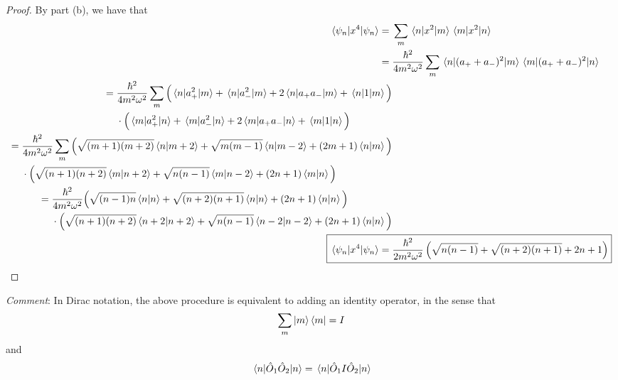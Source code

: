 \documentclass[../psets.tex]{subfiles}
\begin{document}
\begin{enumerate}
\begin{enumerate}
        \begin{proof}
            By part (b), we have that
            \begin{align*}
                \ev{x^4}{\psi_n} ={}& \sum_m\mel{n}{x^2}{m}\mel{m}{x^2}{n}\\
                ={}& \frac{\hbar^2}{4m^2\omega^2}\sum_m\mel{n}{(a_++a_-)^2}{m}\mel{m}{(a_++a_-)^2}{n}\\
                \begin{split}
                    ={}& \frac{\hbar^2}{4m^2\omega^2}\sum_m\Big( \mel{n}{a_+^2}{m}+\mel{n}{a_-^2}{m}+2\mel{n}{a_+a_-}{m}+\mel{n}{1}{m} \Big)\\
                    & \cdot\Big( \mel{m}{a_+^2}{n}+\mel{m}{a_-^2}{n}+2\mel{m}{a_+a_-}{n}+\mel{m}{1}{n} \Big)
                \end{split}\\
                \begin{split}
                    ={}& \frac{\hbar^2}{4m^2\omega^2}\sum_m\Big( \sqrt{(m+1)(m+2)}\braket{n}{m+2}+\sqrt{m(m-1)}\braket{n}{m-2}+(2m+1)\braket{n}{m} \Big)\\
                    & \cdot\Big( \sqrt{(n+1)(n+2)}\braket{m}{n+2}+\sqrt{n(n-1)}\braket{m}{n-2}+(2n+1)\braket{m}{n} \Big)
                \end{split}\\
                \begin{split}
                    ={}& \frac{\hbar^2}{4m^2\omega^2}\Big( \sqrt{(n-1)n}\braket{n}{n}+\sqrt{(n+2)(n+1)}\braket{n}{n}+(2n+1)\braket{n}{n} \Big)\\
                    & \cdot\Big( \sqrt{(n+1)(n+2)}\braket{n+2}{n+2}+\sqrt{n(n-1)}\braket{n-2}{n-2}+(2n+1)\braket{n}{n} \Big)
                \end{split}\\
                \Aboxed{\ev{x^4}{\psi_n} ={}& \frac{\hbar^2}{2m^2\omega^2}\left( \sqrt{n(n-1)}+\sqrt{(n+2)(n+1)}+2n+1 \right)}
            \end{align*}
        \end{proof}
    \end{enumerate}
    \emph{Comment}: In Dirac notation, the above procedure is equivalent to adding an identity operator, in the sense that
    \begin{equation}
        \sum_m\ket{m}\bra{m} = I
    \end{equation}
    and
    \begin{equation}
        \ev{\hat{O}_1\hat{O}_2}{n} = \ev{\hat{O}_1I\hat{O}_2}{n}

\end{equation}
\end{enumerate}
\end{document}
